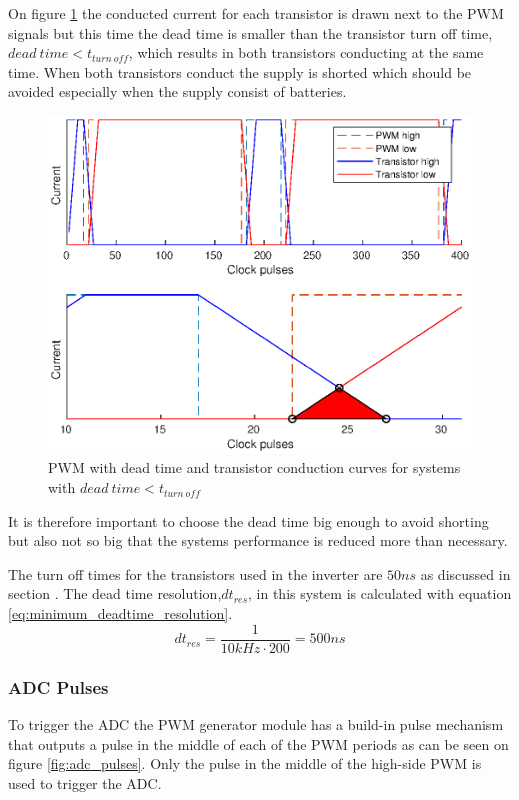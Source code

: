 On figure \ref{fig:turn_off_time2} the conducted current for each transistor is drawn next to the PWM signals but this time the dead time is smaller than the transistor turn off time, $dead \ time < t_{turn \ off}$, which results in both transistors conducting at the same time.
When both transistors conduct the supply is shorted which should be avoided especially when the supply consist of batteries.

\begin{figure}[H]
	\centering
	\includegraphics[width=0.8 \textwidth]{pictures/software/turn_off_time2.eps}
	\caption{PWM with dead time and transistor conduction curves for systems with $dead \ time < t_{turn \ off}$}
	\label{fig:turn_off_time2}
\end{figure}

It is therefore important to choose the dead time big enough to avoid shorting but also not so big that the systems performance is reduced more than necessary.

The turn off times for the transistors used in the inverter are $50ns$ as discussed in section . The dead time resolution,$dt_{res}$, in this system is calculated with equation \ref{eq:minimum_deadtime_resolution}.
\begin{equation}
    dt_{res} = \frac{1}{10kHz \cdot 200} = 500 ns
    \label{eq:minimum_deadtime_resolution}
\end{equation}




\subsubsection*{ADC Pulses}

To trigger the ADC the PWM generator module has a build-in pulse mechanism that outputs a pulse in the middle of each of the PWM periods as can be seen on figure \ref{fig:adc_pulses}. Only the pulse in the middle of the high-side PWM is used to trigger the ADC.

